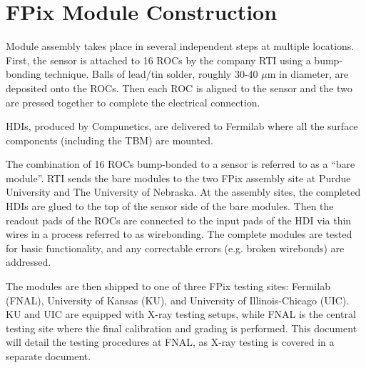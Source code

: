 \section{FPix Module Construction}
\label{s:contruction}

Module assembly takes place in several independent steps at multiple locations.  
First, the sensor is attached to 16 ROCs by the company RTI using a bump-bonding technique.  
Balls of lead/tin solder, roughly 30-40 $\mu$m in diameter, are deposited onto the ROCs.  
Then each ROC is aligned to the sensor and the two are pressed together to complete the electrical connection.

HDIs, produced by Compunetics, are delivered to Fermilab where all the surface components (including the TBM) are mounted.

The combination of 16 ROCs bump-bonded to a sensor is referred to as a “bare module”.  
RTI sends the bare modules to the two FPix assembly site at Purdue University and The University of Nebraska.  
At the assembly sites, the completed HDIs are glued to the top of the sensor side of the bare modules.  
Then the readout pads of the ROCs are connected to the input pads of the HDI via thin wires in a process referred to as wirebonding.  
The complete modules are tested for basic functionality, and any correctable errors (e.g. broken wirebonds) are addressed.

The modules are then shipped to one of three FPix testing sites:  
Fermilab (FNAL), University of Kansas (KU), and University of Illinois-Chicago (UIC).  
KU and UIC are equipped with X-ray testing setups, 
while FNAL is the central testing site where the final calibration and grading is performed.  
This document will detail the testing procedures at FNAL, as X-ray testing is covered in a separate document.
